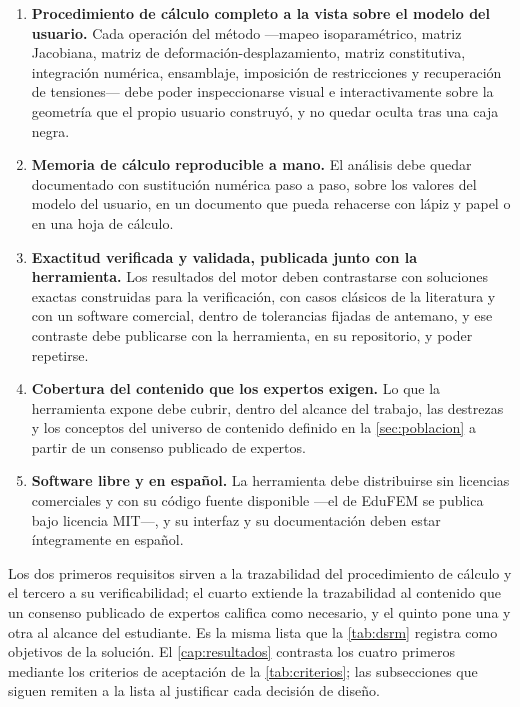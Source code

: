 \begin{enumerate}
    \item \textbf{Procedimiento de cálculo completo a la vista sobre el modelo del usuario.} Cada operación del método —mapeo isoparamétrico, matriz Jacobiana, matriz de deformación-desplazamiento, matriz constitutiva, integración numérica, ensamblaje, imposición de restricciones y recuperación de tensiones— debe poder inspeccionarse visual e interactivamente sobre la geometría que el propio usuario construyó, y no quedar oculta tras una caja negra.
    \item \textbf{Memoria de cálculo reproducible a mano.} El análisis debe quedar documentado con sustitución numérica paso a paso, sobre los valores del modelo del usuario, en un documento que pueda rehacerse con lápiz y papel o en una hoja de cálculo.
    \item \textbf{Exactitud verificada y validada, publicada junto con la herramienta.} Los resultados del motor deben contrastarse con soluciones exactas construidas para la verificación, con casos clásicos de la literatura y con un software comercial, dentro de tolerancias fijadas de antemano, y ese contraste debe publicarse con la herramienta, en su repositorio, y poder repetirse.
    \item \textbf{Cobertura del contenido que los expertos exigen.} Lo que la herramienta expone debe cubrir, dentro del alcance del trabajo, las destrezas y los conceptos del universo de contenido definido en la \autoref{sec:poblacion} a partir de un consenso publicado de expertos.
    \item \textbf{Software libre y en español.} La herramienta debe distribuirse sin licencias comerciales y con su código fuente disponible ---el de EduFEM se publica bajo licencia MIT---, y su interfaz y su documentación deben estar íntegramente en español.
\end{enumerate}

Los dos primeros requisitos sirven a la trazabilidad del procedimiento de cálculo y el tercero a su verificabilidad; el cuarto extiende la trazabilidad al contenido que un consenso publicado de expertos califica como necesario, y el quinto pone una y otra al alcance del estudiante. Es la misma lista que la \autoref{tab:dsrm} registra como objetivos de la solución. El \autoref{cap:resultados} contrasta los cuatro primeros mediante los criterios de aceptación de la \autoref{tab:criterios}; las subsecciones que siguen remiten a la lista al justificar cada decisión de diseño.

